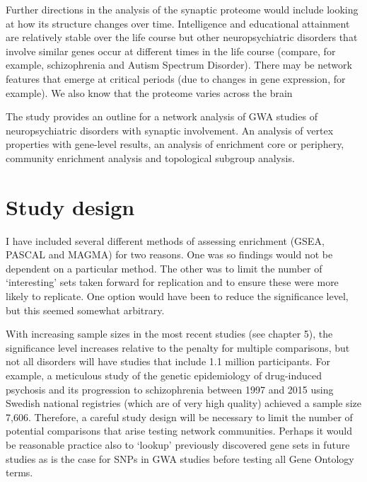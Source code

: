 Further directions in the analysis of the synaptic proteome would include looking at how its structure changes over time. Intelligence and educational attainment are relatively stable over the life course but other neuropsychiatric disorders that involve similar genes occur at different times in the life course (compare, for example, schizophrenia and Autism Spectrum Disorder). There may be network features that emerge at critical periods (due to changes in gene expression, for example).   We also know that the proteome varies across the brain\cite{grant2019synapse}








The study provides an outline for a network analysis of GWA studies of neuropsychiatric disorders with synaptic involvement. An analysis of vertex properties with gene-level results, an analysis of enrichment core or periphery, community enrichment analysis and topological subgroup analysis. 

\section{Study design}
\label{sec:study design discussion}
I have included several different methods of assessing enrichment (GSEA, PASCAL and MAGMA) for two reasons. One was so findings would not be dependent on a particular method. The other was to limit the number of `interesting' sets taken forward for replication and to ensure these were more likely to replicate. One option would have been to reduce the significance level, but this seemed somewhat arbitrary. 

With increasing sample sizes in the most recent studies (see chapter 5), the significance level increases relative to the penalty for multiple comparisons, but not all disorders will have studies that include 1.1 million participants. For example, a meticulous study of the genetic epidemiology of drug-induced psychosis and its progression to schizophrenia between 1997 and 2015 using Swedish national registries (which are of very high quality) achieved a sample size 7,606\cite{kendler2019prediction}. Therefore, a careful study design will be necessary to limit the number of potential comparisons that arise testing network communities. Perhaps it would be reasonable practice also to `lookup' previously discovered gene sets in future studies as is the case for SNPs in GWA studies before testing all Gene Ontology terms.





